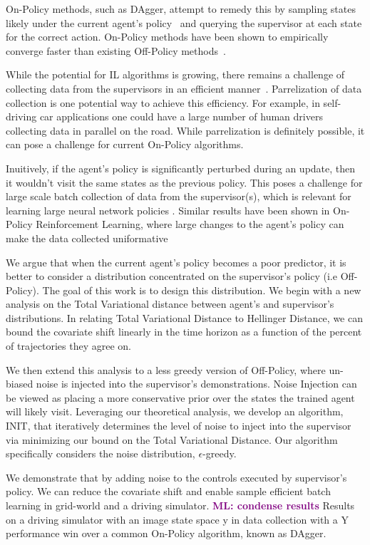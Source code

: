 \documentclass[conference]{article}
\newcommand{\mlnote}[1]{\ifthenelse{ \boolean{include-notes}}%
 {\textcolor{purple}{\textbf{ML: #1}}}{}}
\begin{document}
 On-Policy methods, such as DAgger, attempt to remedy this by sampling states likely under the current agent's policy~\cite{ross2010reduction} and querying the supervisor at each state for the correct action. On-Policy methods have been shown to empirically converge faster than existing Off-Policy methods~\cite{NIPS2014_5421}.
 
While the potential for IL algorithms is growing, there remains a challenge of collecting data from the supervisors in an efficient manner~\cite{laskeycomparing}.  Parrelization of data collection is one potential way to achieve this efficiency. For example, in self-driving car applications one could have a large number of human drivers collecting data in parallel on the road. While parrelization is definitely possible, it can pose a challenge for current On-Policy algorithms.

Inuitively, if the agent's policy is significantly perturbed during an update, then it wouldn't visit the same states as the previous policy. This poses a challenge for large scale batch collection of data from the supervisor(s), which is relevant for learning large neural  network policies \cite{levine2016learning}.  Similar results have been shown in On-Policy Reinforcement Learning, where large changes to the agent's policy can make the data collected uniformative~\cite{schulman2015trust}

We argue that when the current agent's policy becomes a poor predictor, it is better to consider a distribution concentrated on the supervisor's policy (i.e Off-Policy). The goal of this work is to design this distribution. We begin with a new  analysis on the Total Variational distance between agent's and supervisor's distributions. In relating Total Variational Distance to Hellinger Distance, we can bound the covariate shift linearly in the time horizon as a function of the percent of trajectories they agree  on. 

We then extend this analysis to a less greedy version of Off-Policy, where un-biased noise is injected into the supervisor's demonstrations. Noise Injection can be viewed as placing a more conservative prior over the states the trained agent will likely visit. Leveraging our theoretical analysis, we develop an algorithm, INIT, that iteratively determines the level of noise to inject into the supervisor via minimizing our bound on the Total Variational Distance.  Our algorithm specifically considers the noise distribution, $\epsilon$-greedy.

We demonstrate that by adding noise to the controls executed by supervisor's policy.  We can reduce the covariate shift and enable sample efficient batch learning in grid-world and a driving simulator. \mlnote{condense results} Results on a driving simulator with an image state space y in data collection with a Y performance win over a common On-Policy algorithm, known as DAgger. 
\end{document}
